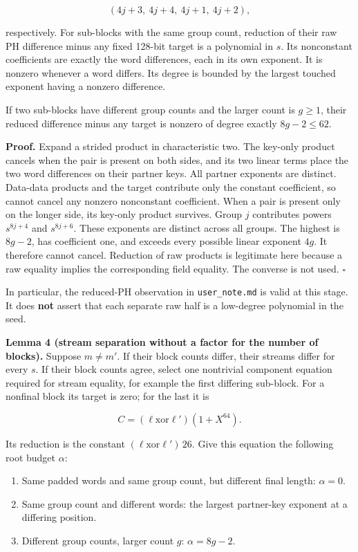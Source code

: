 \documentclass[
  11pt,
]{article}
\providecommand{\tightlist}{%
  \setlength{\itemsep}{0pt}\setlength{\parskip}{0pt}}
\begin{document}
\[ (4j+3,\ 4j+4,\ 4j+1,\ 4j+2), \]

respectively. For sub-blocks with the same group count, reduction of
their raw PH difference minus any fixed 128-bit target is a polynomial
in \(s\). Its nonconstant coefficients are exactly the word differences,
each in its own exponent. It is nonzero whenever a word differs. Its
degree is bounded by the largest touched exponent having a nonzero
difference.

If two sub-blocks have different group counts and the larger count is
\(g\ge1\), their reduced difference minus any target is nonzero of
degree exactly \(8g-2\le62\).

\textbf{Proof.} Expand a strided product in characteristic two. The
key-only product cancels when the pair is present on both sides, and its
two linear terms place the two word differences on their partner keys.
All partner exponents are distinct. Data-data products and the target
contribute only the constant coefficient, so cannot cancel any nonzero
nonconstant coefficient. When a pair is present only on the longer side,
its key-only product survives. Group \(j\) contributes powers
\(s^{8j+4}\) and \(s^{8j+6}\). These exponents are distinct across all
groups. The highest is \(8g-2\), has coefficient one, and exceeds every
possible linear exponent \(4g\). It therefore cannot cancel. Reduction
of raw products is legitimate here because a raw equality implies the
corresponding field equality. The converse is not used. \(\square\)

In particular, the reduced-PH observation in \texttt{user\_note.md} is
valid at this stage. It does \textbf{not} assert that each separate raw
half is a low-degree polynomial in the seed.

\textbf{Lemma 4 (stream separation without a factor for the number of
blocks).} Suppose \(m\ne m'\). If their block counts differ, their
streams differ for every \(s\). If their block counts agree, select one
nontrivial component equation required for stream equality, for example
the first differing sub-block. For a nonfinal block its target is zero;
for the last it is

\[ C=(\ell\mathbin{\mathrm{xor}}\ell')(1+X^{64}). \]

Its reduction is the constant \((\ell\mathbin{\mathrm{xor}}\ell')\,26\).
Give this equation the following root budget \(\alpha\):

\begin{enumerate}
\def\labelenumi{\arabic{enumi}.}
\tightlist
\item
  Same padded words and same group count, but different final length:
  \(\alpha=0\).
\item
  Same group count and different words: the largest partner-key exponent
  at a differing position.
\item
  Different group counts, larger count \(g\): \(\alpha=8g-2\).
\end{enumerate}
\end{document}
